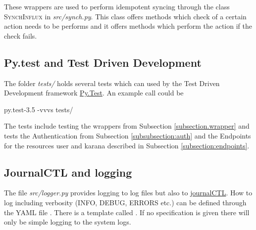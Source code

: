 These wrappers are used to perform idempotent syncing through the class \textsc{SynchInflux} in \textit{src/synch.py}. This class offers methods which check of a certain action needs to be performs and it offers methods which perform the action if the check fails. 
\subsection{Py.test and Test Driven Development}
The folder \textit{tests/} holds several tests which can used by the Test Driven Development framework \href{https://wiki.python.org/moin/PyTest}{Py.Test}. An example call could be
\begin{tcolorbox}
	py.test-3.5 -vvvs tests/
\end{tcolorbox}
The tests include testing the wrappers from Subsection \ref{subsection.wrapper} and tests the Authentication from Subsection \ref{subsubsection:auth} and the Endpoints for the resources user and karana described in Subsection \ref{subsection:endpoints}.
\subsection{JournalCTL and logging}
The file \textit{src/logger.py} provides logging to log files but also to \href{https://www.freedesktop.org/software/systemd/man/journalctl.html}{journalCTL}. How to log including verbosity (INFO, DEBUG, ERRORS etc.) can be defined through the YAML file . There is a template called . If no specification is given there will only be simple logging to the system logs.